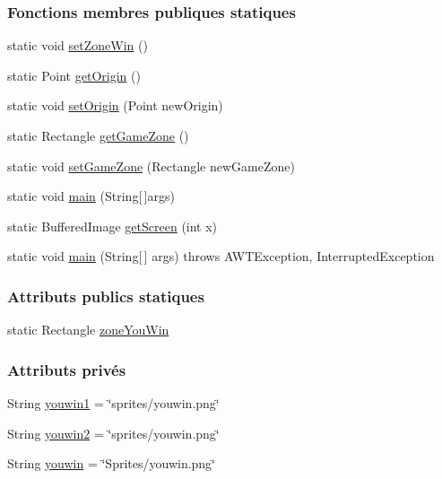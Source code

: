 \subsubsection*{Fonctions membres publiques statiques}
\begin{DoxyCompactItemize}
\item 
static void \hyperlink{classSuchi_1_1Game_ae9281ba8129a421e5d9607fc5eb5b41b}{set\+Zone\+Win} ()
\item 
static Point \hyperlink{classSuchi_1_1Game_a44d83961cd9bd6e93e8a21bd2865d49d}{get\+Origin} ()
\item 
static void \hyperlink{classSuchi_1_1Game_adf6b2ce5a22c42201a840fb0560b76f8}{set\+Origin} (Point new\+Origin)
\item 
static Rectangle \hyperlink{classSuchi_1_1Game_a73f030fa4f2c33ab3eb297423ff7a653}{get\+Game\+Zone} ()
\item 
static void \hyperlink{classSuchi_1_1Game_af37a4c12dd370a9b2865eb3cf667155e}{set\+Game\+Zone} (Rectangle new\+Game\+Zone)
\item 
static void \hyperlink{classSuchi_1_1Game_ab791d29f0d1d51ffb369a47c5def6ded}{main} (String\mbox{[}$\,$\mbox{]}args)
\item 
static Buffered\+Image \hyperlink{classSuchi_1_1Game_af0783e5007b8544ae5bba0cb78af3fb9}{get\+Screen} (int x)
\item 
static void \hyperlink{classSuchi_1_1Game_a4d54c6aa1bfad6d6203cd1f6a6096851}{main} (String\mbox{[}$\,$\mbox{]} args)  throws A\+W\+T\+Exception, Interrupted\+Exception 
\end{DoxyCompactItemize}
\subsubsection*{Attributs publics statiques}
\begin{DoxyCompactItemize}
\item 
static Rectangle \hyperlink{classSuchi_1_1Game_a2d7d0ec84563aca4b9eb88e861cefabe}{zone\+You\+Win}
\end{DoxyCompactItemize}
\subsubsection*{Attributs privés}
\begin{DoxyCompactItemize}
\item 
String \hyperlink{classSuchi_1_1Game_ae96d9d4f7dfa76d515cd059fa78884e8}{youwin1} = \char`\"{}sprites/youwin.\+png\char`\"{}
\item 
String \hyperlink{classSuchi_1_1Game_addb638e2316b9b72f74483db82eda767}{youwin2} = \char`\"{}sprites/youwin.\+png\char`\"{}
\item 
String \hyperlink{classSuchi_1_1Game_ac376917f0f8c62cd49134c459c61fd2c}{youwin} = \char`\"{}Sprites/youwin.\+png\char`\"{}
\end{DoxyCompactItemize}
